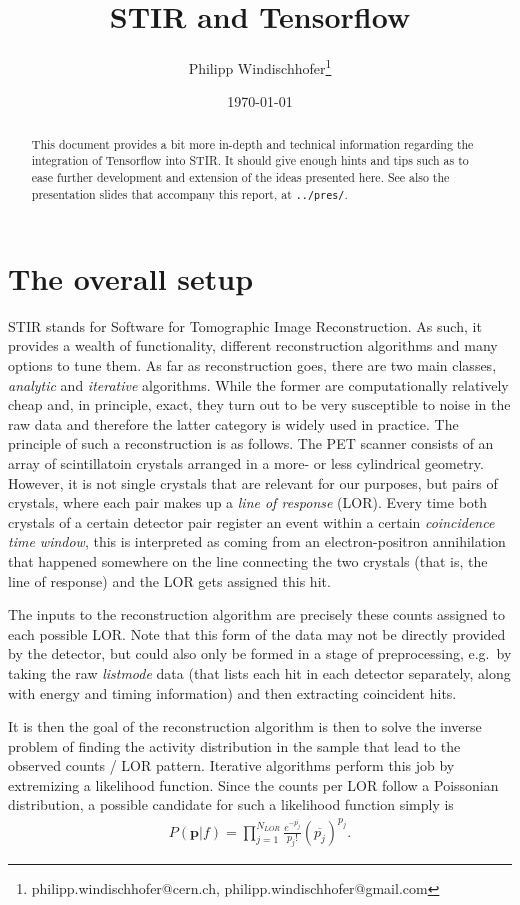 \documentclass[a4paper, 11pt]{article}
\title{STIR and Tensorflow}
\author{Philipp Windischhofer\thanks{philipp.windischhofer@cern.ch, philipp.windischhofer@gmail.com}}
\date{\today}
\begin{document}
  \maketitle

  \begin{abstract}
    \noindent This document provides a bit more in-depth and technical information regarding the integration of Tensorflow into STIR. It should give enough hints and tips such as to ease further development and extension of the ideas presented here. See also the presentation slides that accompany this report, at \texttt{../pres/}.
  \end{abstract}

  \section{The overall setup}
  STIR stands for Software for Tomographic Image Reconstruction. As such, it provides a wealth of functionality, different reconstruction algorithms and many options to tune them. As far as reconstruction goes, there are two main classes, \textsl{analytic} and \textsl{iterative} algorithms. While the former are computationally relatively cheap and, in principle, exact, they turn out to be very susceptible to noise in the raw data and therefore the latter category is widely used in practice. 
  The principle of such a reconstruction is as follows. The PET scanner consists of an array of scintillatoin crystals arranged in a more- or less cylindrical geometry. However, it is not single crystals that are relevant for our purposes, but pairs of crystals, where each pair makes up a \textsl{line of response} (LOR). Every time both crystals of a certain detector pair register an event within a certain \textsl{coincidence time window}, this is interpreted as coming from an electron-positron annihilation that happened somewhere on the line connecting the two crystals (that is, the line of response) and the LOR gets assigned this hit. 

  The inputs to the reconstruction algorithm are precisely these counts assigned to each possible LOR. Note that this form of the data may not be directly provided by the detector, but could also only be formed in a stage of preprocessing, e.g.~by taking the raw \textsl{listmode} data (that lists each hit in each detector separately, along with energy and timing information) and then extracting coincident hits.

  It is then the goal of the reconstruction algorithm is then to solve the inverse problem of finding the activity distribution in the sample that lead to the observed counts / LOR pattern. Iterative algorithms perform this job by extremizing a likelihood function. Since the counts per LOR follow a Poissonian distribution, a possible candidate for such a likelihood function simply is
  \begin{align}
    P(\mathbf{p} | f) = \prod_{j = 1}^{N_{LOR}} \frac{e^{-\overline{p_j}}}{p_j!} (\overline{p_j})^{p_j}.
  \end{align}
  
\end{document}
